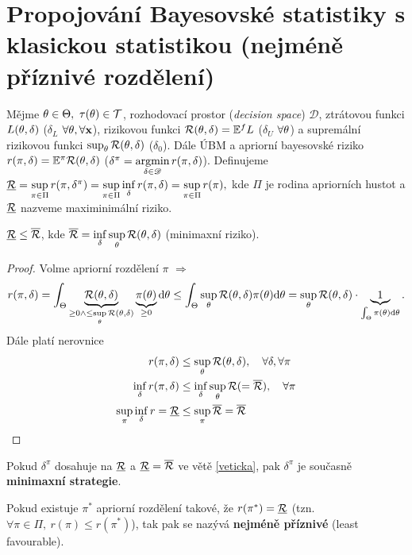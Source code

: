 \section{Propojování Bayesovské statistiky s klasickou statistikou (nejméně příznivé rozdělení)}
\begin{define}
	Mějme $\theta\in\Theta,~\tau(\theta)\in\mathcal{T}$, rozhodovací prostor (\textit{decision space}) $\mathscr{D}$, ztrátovou funkci  $L(\theta,\delta)$ ($\delta_L$ $\forall \theta,\forall \textbf{x}$), rizikovou funkci $\mathcal{R}(\theta,\delta)=\mathbb{E}^fL$ ($\delta_U$ $\forall\theta$) a supremální rizikovou funkci $\sup_\theta\mathcal{R}(\theta,\delta)$ ($\delta_0$). Dále ÚBM a apriorní bayesovské riziko $r(\pi,\delta)=\mathbb{E}^\pi\mathcal{R}(\theta,\delta)$ ($\delta^{\pi}=\mathop{\mathrm{argmin}}\limits_{\delta\in\mathscr{D}}r(\pi,\delta)$). Definujeme $\underline{\mathcal{R}}=\sup\limits_{\pi\in\Pi} r(\pi,\delta^{\pi})=\sup\limits_{\pi\in\Pi}\inf\limits_{\delta} r(\pi,\delta)=\sup\limits_{\pi\in\Pi}r(\pi),$ kde $\Pi$ je rodina apriorních hustot a $\underline{\mathcal{R}}$ nazveme maximinimální riziko.
\end{define}
\begin{theorem}\label{veticka}
	$\underline{\mathcal{R}}\leq \overline{\mathcal{R}}$, kde $\overline{\mathcal{R}}=\inf\limits_\delta\sup\limits_\theta \mathcal{R}(\theta,\delta)$ (minimaxní riziko).
	\begin{proof}
		Volme apriorní rozdělení $\pi$ $\Rightarrow$ $$ r(\pi,\delta)=\int_\Theta\underbrace{\mathcal{R}(\theta,\delta)}_{\geq0\wedge\leq \sup\limits_{\theta}\mathcal{R}(\theta,\delta)}\underbrace{\pi(\theta)}_{\geq0}\mathrm{d}\theta\leq \int_{\Theta}\sup\limits_\theta \mathcal{R}(\theta,\delta)\pi(\theta)\mathrm{d}\theta=\sup\limits_\theta \mathcal{R}(\theta,\delta)\cdot \underbrace{1}_{\int_{\Theta}\pi(\theta)\mathrm{d}\theta}.$$
		Dále platí nerovnice \[
		\begin{split}
		r(\pi,\delta)&\leq \sup\limits_\theta\mathcal{R}(\theta,\delta),\quad \forall\delta,\forall\pi\\
		\inf\limits_\delta r(\pi,\delta)&\leq \inf\limits_\delta\sup\limits_\theta \mathcal{R} (=\overline{\mathcal{R}}),\quad \forall\pi\\
		\sup\limits_\pi\inf\limits_\delta r=\underline{\mathcal{R}}&\leq \sup\limits_{\pi}\overline{\mathcal{R}}=\overline{\mathcal{R}}
		\end{split}
		\]
	\end{proof}
\end{theorem}
\begin{remark}
	Pokud $\delta^\pi$ dosahuje na $\underline{\mathcal{R}}$ a $\underline{\mathcal{R}}=\overline{\mathcal{R}}$ ve větě \ref{veticka}, pak $\delta^\pi$ je současně \textbf{minimaxní strategie}.
\end{remark}
\begin{define}
	Pokud existuje $\pi^\ast$ apriorní rozdělení takové, že $r(\pi ^\ast)=\underline{\mathcal{R}}$ (tzn. $\forall\pi\in\Pi,~r(\pi)\leq r(\pi^\ast)$), tak pak se nazývá \textbf{nejméně příznivé} (least favourable).
\end{define}

